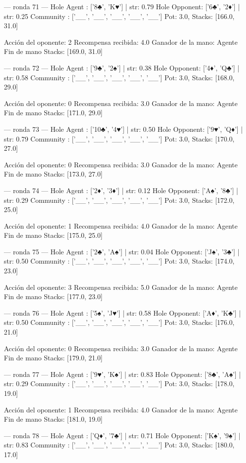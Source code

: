 --- ronda 71 ---
Hole Agent : ['8♣', 'K♥'] | str: 0.79
Hole Opponent: ['6♣', '2♦'] | str: 0.25
Community  : ['__', '__', '__', '__', '__']
Pot: 3.0, Stacks: [166.0, 31.0]

Acción del oponente: 2
Recompensa recibida: 4.0
Ganador de la mano: Agente
Fin de mano Stacks: [169.0, 31.0]


--- ronda 72 ---
Hole Agent : ['9♣', '2♠'] | str: 0.38
Hole Opponent: ['4♦', 'Q♣'] | str: 0.58
Community  : ['__', '__', '__', '__', '__']
Pot: 3.0, Stacks: [168.0, 29.0]

Acción del oponente: 0
Recompensa recibida: 3.0
Ganador de la mano: Agente
Fin de mano Stacks: [171.0, 29.0]


--- ronda 73 ---
Hole Agent : ['10♣', '4♥'] | str: 0.50
Hole Opponent: ['9♥', 'Q♦'] | str: 0.79
Community  : ['__', '__', '__', '__', '__']
Pot: 3.0, Stacks: [170.0, 27.0]

Acción del oponente: 0
Recompensa recibida: 3.0
Ganador de la mano: Agente
Fin de mano Stacks: [173.0, 27.0]


--- ronda 74 ---
Hole Agent : ['2♦', '3♦'] | str: 0.12
Hole Opponent: ['A♠', '8♣'] | str: 0.29
Community  : ['__', '__', '__', '__', '__']
Pot: 3.0, Stacks: [172.0, 25.0]

Acción del oponente: 1
Recompensa recibida: 4.0
Ganador de la mano: Agente
Fin de mano Stacks: [175.0, 25.0]


--- ronda 75 ---
Hole Agent : ['2♣', 'A♠'] | str: 0.04
Hole Opponent: ['J♠', '3♣'] | str: 0.50
Community  : ['__', '__', '__', '__', '__']
Pot: 3.0, Stacks: [174.0, 23.0]

Acción del oponente: 3
Recompensa recibida: 5.0
Ganador de la mano: Agente
Fin de mano Stacks: [177.0, 23.0]


--- ronda 76 ---
Hole Agent : ['5♠', 'J♥'] | str: 0.58
Hole Opponent: ['A♦', 'K♣'] | str: 0.50
Community  : ['__', '__', '__', '__', '__']
Pot: 3.0, Stacks: [176.0, 21.0]

Acción del oponente: 0
Recompensa recibida: 3.0
Ganador de la mano: Agente
Fin de mano Stacks: [179.0, 21.0]


--- ronda 77 ---
Hole Agent : ['9♥', 'K♠'] | str: 0.83
Hole Opponent: ['8♣', 'A♠'] | str: 0.29
Community  : ['__', '__', '__', '__', '__']
Pot: 3.0, Stacks: [178.0, 19.0]

Acción del oponente: 1
Recompensa recibida: 4.0
Ganador de la mano: Agente
Fin de mano Stacks: [181.0, 19.0]


--- ronda 78 ---
Hole Agent : ['Q♦', '7♣'] | str: 0.71
Hole Opponent: ['K♠', '9♠'] | str: 0.83
Community  : ['__', '__', '__', '__', '__']
Pot: 3.0, Stacks: [180.0, 17.0]

